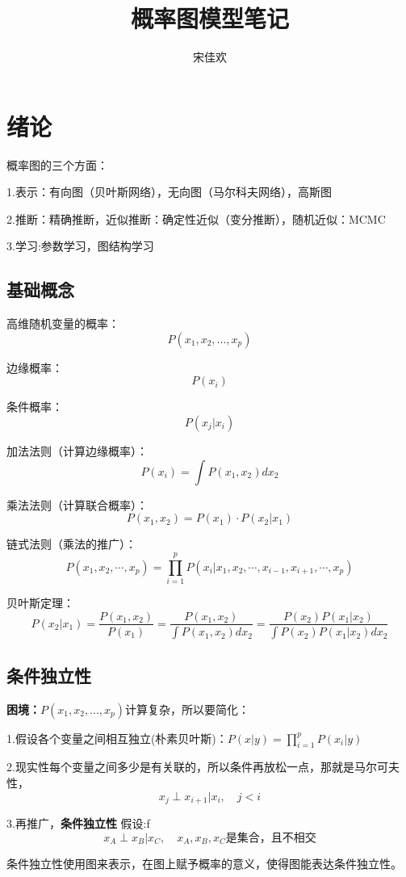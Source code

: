 \documentclass[UTF8]{ctexart} %
\title{概率图模型笔记}
\author{宋佳欢}
\begin{document}
	\maketitle
	\tableofcontents
	\songti {}
	
	
	\section{绪论}
		概率图的三个方面：
		
		1.表示：有向图（贝叶斯网络），无向图（马尔科夫网络），高斯图
		
		2.推断：精确推断，近似推断：确定性近似（变分推断），随机近似：MCMC
		
		3.学习:参数学习，图结构学习
		
		\subsection{基础概念}
			高维随机变量的概率：\[P(x_1,x_2,...,x_p)\]
			
			边缘概率：\[P(x_i)\]
			
			条件概率：\[P(x_j|x_i)\]
		
			加法法则（计算边缘概率）：\[P(x_i) = \int P(x_1,x_2)dx_2\]
			
			乘法法则（计算联合概率）：\[P(x_1,x_2) = P(x_1)\cdot P(x_2|x_1)\]
			
			链式法则（乘法的推广）：\[P(x_1,x_2,\cdots,x_p) = \prod_{i=1}^pP(x_i|x_1,x_2,\cdots,x_{i-1},x_{i+1},\cdots, x_p)\]
			
			贝叶斯定理：
			\[P(x_2|x_1)=\frac{P(x_1,x_2)}{P(x_1)} = \frac{P(x_1,x_2)}{\int P(x_1,x_2)dx_2} = \frac{P(x_2) P(x_1|x_2)}{\int P(x_2) P(x_1|x_2)dx_2}\]
			
		\subsection{条件独立性}	
			\textbf{困境：}$P(x_1,x_2,...,x_p)$计算复杂，所以要简化：
			
			1.假设各个变量之间相互独立(朴素贝叶斯)：$P(x|y) = \prod_{i=1}^pP(x_i|y)$
			
			2.现实性每个变量之间多少是有关联的，所以条件再放松一点，那就是马尔可夫性，\[x_j\perp x_{i+1}|x_i,\quad j<i\]
			                                                                         
			3.再推广，\textbf{条件独立性} 假设:f
			\[x_A\perp x_B|x_C,\quad x_A,x_B,x_C\text{是集合，且不相交}\]
			
			条件独立性使用图来表示，在图上赋予概率的意义，使得图能表达条件独立性。
			
\end{document}

